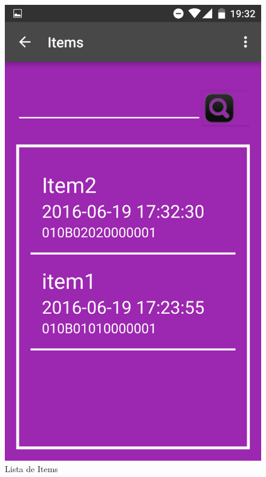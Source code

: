 \documentclass[a4paper,11pt]{book}
\begin{document}
\begin{figure}[H]
  \includegraphics[width=\linewidth]{imagenes/pruebas/movil/movil5.png}
  \caption{Lista de Items\cite{propio}}
\endminipage\hfill
{}

\end{figure}
\end{document}
